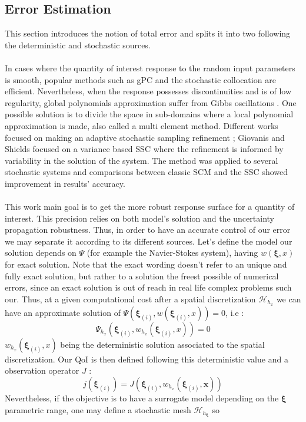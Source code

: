 \documentclass[11pt, a4paper, English]{report}
\begin{document}
\begin{appendix}
\section{Error Estimation}
This section introduces the notion of total error and splits it into two following the deterministic and stochastic sources. 
\\\\
In cases where the quantity of interest response to the random input parameters is smooth, popular methods such as gPC and the stochastic collocation are efficient. Nevertheless, when the response possesses discontinuities and is of low regularity, global polynomials approximation suffer from Gibbs oscillations \cite{Janthesis}. One possible solution is to divide the space in sub-domains where a local polynomial approximation is made, also called a multi element method. Different works focused on making an adaptive stochastic sampling refinement ; Giovanis and Shields \cite{Giovanis} focused on a variance based SSC where the refinement is informed by variability in the solution of the
system. The method was applied to several stochastic systems and comparisons between classic SCM and the SSC showed improvement in results' accuracy.\\\\
This work main goal is to get the more robust response surface for a quantity of interest. This precision relies on both model's solution and the uncertainty propagation robustness. Thus, in order to have an accurate control of our error we may separate it according to its different sources. Let's define the model our solution depends on $\Psi$ (for example the Navier-Stokes system), having $w(\boldsymbol{\xi},x)$ for exact solution. Note that the exact wording doesn't refer to an unique and fully exact solution, but rather to a solution the freest possible of numerical errors, since an exact solution is out of reach in real life complex problems such our. Thus, at a given computational cost after a spatial discretization $\mathcal{H}_{h_x}$ we can have an approximate solution of $\Psi(\boldsymbol{\xi}_{(i)},w(\boldsymbol{\xi}_{(i)},x))=0$, i.e \cite{Janthesis}:
$$\Psi_{h_x}(\boldsymbol{\xi}_{(i)},w_{h_x}(\boldsymbol{\xi}_{(i)},x))=0$$
$w_{h_x}(\boldsymbol{\xi}_{(i)},x)$ being the deterministic solution associated to the spatial discretization. Our QoI is then defined following this deterministic value and a observation operator $J$ :
$$j(\boldsymbol{\xi}_{(i)}) = J(\boldsymbol{\xi}_{(i)}, w_{h_x}(\boldsymbol{\xi}_{(i)},\boldsymbol{x})) $$
Nevertheless, if the objective is to have a surrogate model depending on the $\boldsymbol{\xi}$ parametric range, one may define a stochastic mesh $\mathcal{H}_{h_\boldsymbol{\xi}}$ so 

\end{appendix}
\end{document}

